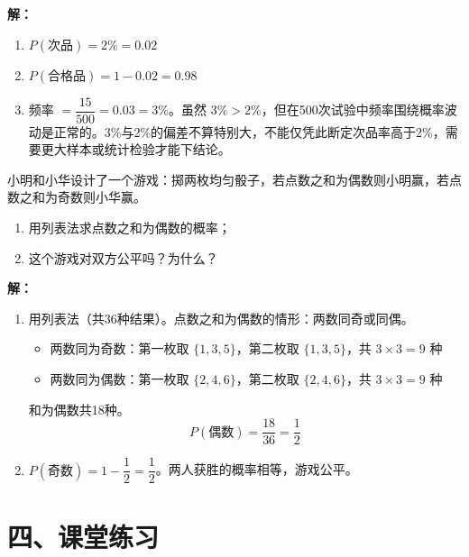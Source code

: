 \documentclass[12pt, a4paper]{ctexart}
\begin{document}
\textbf{解：}
\begin{enumerate}[label=(\arabic*)]
  \item $P(\text{次品}) = 2\% = 0.02$

  \item $P(\text{合格品}) = 1 - 0.02 = 0.98$

  \item 频率 $= \dfrac{15}{500} = 0.03 = 3\%$。虽然 $3\% > 2\%$，但在500次试验中频率围绕概率波动是正常的。3\%与2\%的偏差不算特别大，不能仅凭此断定次品率高于2\%，需要更大样本或统计检验才能下结论。
\end{enumerate}

\begin{appbox}[【应用4】游戏公平性]
小明和小华设计了一个游戏：掷两枚均匀骰子，若点数之和为偶数则小明赢，若点数之和为奇数则小华赢。
\begin{enumerate}[label=(\arabic*)]
  \item 用列表法求点数之和为偶数的概率；
  \item 这个游戏对双方公平吗？为什么？
\end{enumerate}
\end{appbox}

\textbf{解：}

\begin{enumerate}[label=(\arabic*)]
  \item 用列表法（共36种结果）。点数之和为偶数的情形：两数同奇或同偶。
  \begin{itemize}[leftmargin=2em]
    \item 两数同为奇数：第一枚取 $\{1,3,5\}$，第二枚取 $\{1,3,5\}$，共 $3 \times 3 = 9$ 种
    \item 两数同为偶数：第一枚取 $\{2,4,6\}$，第二枚取 $\{2,4,6\}$，共 $3 \times 3 = 9$ 种
  \end{itemize}
  和为偶数共18种。
  \[
    P(\text{偶数}) = \frac{18}{36} = \frac{1}{2}
  \]

  \item $P(\text{奇数}) = 1 - \dfrac{1}{2} = \dfrac{1}{2}$。两人获胜的概率相等，游戏公平。
\end{enumerate}

\newpage
\section*{\textcolor{tipgreen}{四、课堂练习}}
\end{document}
